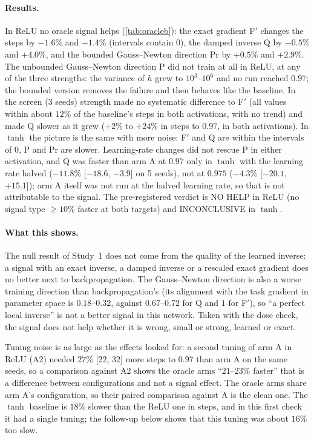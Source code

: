 \paragraph{Results.} In ReLU no oracle signal helps (\cref{tab:oracleb}): the exact gradient F$'$ changes the steps by $-1.6\%$ and $-1.4\%$ (intervals contain 0), the damped inverse Q by $-0.5\%$ and $+4.0\%$, and the bounded Gauss--Newton direction Pr by $+0.5\%$ and $+2.9\%$. The unbounded Gauss--Newton direction P did not train at all in ReLU, at any of the three strengths: the variance of $h$ grew to $10^3$--$10^6$ and no run reached $0.97$; the bounded version removes the failure and then behaves like the baseline. In the screen (3 seeds) strength made no systematic difference to F$'$ (all values within about $12\%$ of the baseline's steps in both activations, with no trend) and made Q slower as it grew ($+2\%$ to $+24\%$ in steps to $0.97$, in both activations). In $\tanh$ the picture is the same with more noise: F$'$ and Q are within the intervals of 0, P and Pr are slower. Learning-rate changes did not rescue P in either activation, and Q was faster than arm A at $0.97$ only in $\tanh$ with the learning rate halved ($-11.8\%$ [$-18.6$, $-3.9$] on 5 seeds), not at $0.975$ ($-4.3\%$ [$-20.1$, $+15.1$]); arm A itself was not run at the halved learning rate, so that is not attributable to the signal. The pre-registered verdict is NO HELP in ReLU (no signal type $\geq10\%$ faster at both targets) and INCONCLUSIVE in $\tanh$.

\paragraph{What this shows.} The null result of Study~1 does not come from the quality of the learned inverse: a signal with an exact inverse, a damped inverse or a rescaled exact gradient does no better next to backpropagation. The Gauss--Newton direction is also a worse training direction than backpropagation's (its alignment with the task gradient in parameter space is $0.18$--$0.32$, against $0.67$--$0.72$ for Q and $1$ for F$'$), so ``a perfect local inverse'' is not a better signal in this network. Taken with the dose check, the signal does not help whether it is wrong, small or strong, learned or exact.

\begin{caution}
Tuning noise is as large as the effects looked for: a second tuning of arm A in ReLU (A2) needed $27\%$ [$22$, $32$] more steps to $0.97$ than arm A on the same seeds, so a comparison against A2 shows the oracle arms ``$21$--$23\%$ faster'' that is a difference between configurations and not a signal effect. The oracle arms share arm A's configuration, so their paired comparison against A is the clean one. The $\tanh$ baseline is $18\%$ slower than the ReLU one in steps, and in this first check it had a single tuning; the follow-up below shows that this tuning was about $16\%$ too slow.
\end{caution}

